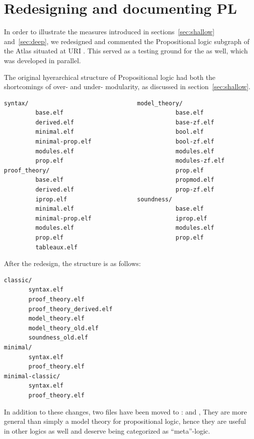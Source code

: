 \section{Redesigning and documenting PL}\label{sec:pl}

In order to illustrate the measures introduced in sections~\ref{sec:shallow} and~\ref{sec:deep}, we redesigned and commented the Propositional logic subgraph of the Atlas situated at URI . This served as a testing ground for the  as well, which was developed in parallel.

The original hyerarchical structure of Propositional logic had both the shortcomings of over- and under- modularity, as discussed in section~\ref{sec:shallow}.
\begin{verbatim}
syntax/                               model_theory/
         base.elf                                base.elf
         derived.elf                             base-zf.elf
         minimal.elf                             bool.elf
         minimal-prop.elf                        bool-zf.elf
         modules.elf                             modules.elf
         prop.elf                                modules-zf.elf
proof_theory/                                    prop.elf
         base.elf                                propmod.elf
         derived.elf                             prop-zf.elf
         iprop.elf                    soundness/
         minimal.elf                             base.elf
         minimal-prop.elf                        iprop.elf
         modules.elf                             modules.elf
         prop.elf                                prop.elf
         tableaux.elf
\end{verbatim}

After the redesign, the structure is as follows:
\begin{verbatim}
classic/
       syntax.elf
       proof_theory.elf
       proof_theory_derived.elf
       model_theory.elf
       model_theory_old.elf
       soundness_old.elf
minimal/
       syntax.elf
       proof_theory.elf
minimal-classic/
       syntax.elf
       proof_theory.elf
\end{verbatim}
In addition to these changes, two files have been moved to :  and , They are more general than simply a model theory for propositional logic, hence they are useful in other logics as well and deserve being categorized as ``meta''-logic.

